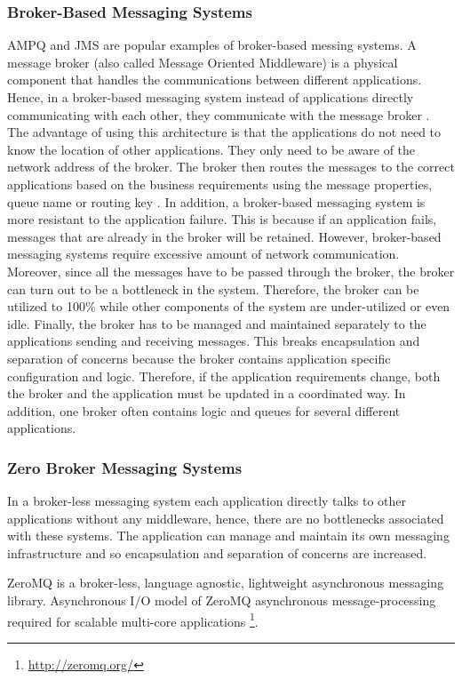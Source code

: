 \documentclass[a4paper,11pt,twoside]{article}
\begin{document}
\subsubsection{Broker-Based Messaging Systems} 
AMPQ and JMS are popular examples of broker-based messing systems. A message broker (also called Message Oriented Middleware) is a physical component that handles the communications between different applications. Hence, in a broker-based messaging system instead of applications directly communicating with each other, they communicate with the message broker \cite{broker}. The advantage of using this architecture is that the applications do not need to know the location of other applications. They only need to be aware of the network address of the broker. The broker then routes the messages to the correct applications based on the business requirements using the message properties, queue name or routing key \cite{AMPQ}. In addition, a broker-based messaging system is more resistant to the application failure. This is because if an application fails, messages that are already in the broker will be retained. However, broker-based messaging systems require excessive amount of network communication. Moreover, since all the messages have to be passed through the broker, the broker can turn out to be a bottleneck in the system. Therefore, the broker can be utilized to 100\% while other components of the system are under-utilized or even idle. Finally, the broker has to be managed and maintained separately to the applications sending and receiving messages. This breaks encapsulation and separation of concerns because the broker contains application specific configuration and logic. Therefore, if the application requirements change, both the broker and the application must be updated in a coordinated way. In addition, one broker often contains logic and queues for several different applications.

\subsubsection{Zero Broker Messaging Systems} 
In a broker-less messaging system each application directly talks to other applications without any middleware, hence, there are no bottlenecks associated with these systems. The application can manage and maintain its own messaging infrastructure and so encapsulation and separation of concerns are increased.

ZeroMQ is a broker-less, language agnostic, lightweight asynchronous messaging library. Asynchronous I/O model of ZeroMQ asynchronous message-processing required for scalable multi-core applications \footnote{\label{ZeroMQ} \url{http://zeromq.org/}}. 
\end{document}
